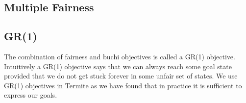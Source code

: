 \subsection{Multiple Fairness}

\subsection{GR(1)}

The combination of fairness and buchi objectives is called a GR(1) objective. Intuitively a GR(1) objective says that we can always reach some goal state provided that we do not get stuck forever in some unfair set of states. We use GR(1) objectives in Termite as we have found that in practice it is sufficient to express our goals.

